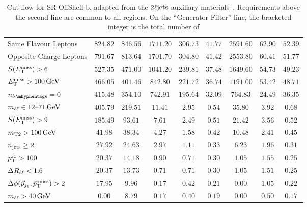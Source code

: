 \begin{sidewaystable}[tp]
{\begin{tabular}{lcccccccc}
Same Flavour Leptons                                       & $824.82$ & $846.56$ & $1711.20$ & $306.73$ & $41.77$ & $2591.60$ & $62.90$ & $52.39$ \\
Opposite Charge Leptons                                   & $791.67$ & $813.64$ & $1701.70$ & $304.80$ & $41.42$ & $2553.80$ & $60.41$ & $51.77$ \\
$\metsig > 6$                                               & $527.35$ & $471.00$ & $1041.20$ & $239.81$ & $37.48$ & $1649.60$ & $54.73$ & $49.23$ \\
$\met > 100\,\eV[G]$                                           & $466.05$ & $401.46$ & $842.80$ & $221.72$ & $36.74$ & $1191.00$ & $53.42$ & $48.71$ \\
\hline
$\nbtag = 0$                                             & $415.48$ & $354.10$ & $742.91$ & $195.64$ & $32.09$ & $764.83$ & $24.49$ & $36.35$ \\
$\mll \in 12\text{--}71\,\eV[G]$                             & $405.79$ & $219.51$ & $11.41$ & $2.95$ & $0.54$ & $35.80$ & $3.92$ & $0.68$ \\
$\metsig > 9$                                             & $185.49$ & $93.61$ & $7.61$ & $2.49$ & $0.51$ & $21.42$ & $3.56$ & $0.52$ \\
$\mttwo > 100\,\eV[G]$                                       & $41.98$ & $38.34$ & $4.27$ & $1.58$ & $0.42$ & $10.48$ & $2.41$ & $0.45$ \\
$\njet \geq 2$                               & $27.92$ & $24.63$ & $2.97$ & $1.11$ & $0.33$ & $6.23$ & $1.96$ & $0.31$ \\
$\pt^{j_1} > 100$                      & $20.37$ & $14.18$ & $0.90$ & $0.71$ & $0.30$ & $1.05$ & $1.55$ & $0.25$ \\
$\rll < 1.6$                                              & $20.37$ & $13.73$ & $0.71$ & $0.71$ & $0.30$ & $1.05$ & $1.51$ & $0.25$ \\
$\dphijmet > 2$               & $17.95$ & $9.96$ & $0.17$ & $0.42$ & $0.21$ & $0.00$ & $1.05$ & $0.22$ \\
$\mll > 40\,\eV[G]$                                          & $0.00$ & $8.79$ & $0.17$ & $0.40$ & $0.19$ & $0.00$ & $0.50$ & $0.17$ \\
\end{tabular}
}
\caption[
Cut-flow for SR-OffShell-b
]{%
Cut-flow for SR-OffShell-b,
adapted from the $\twoljets$ auxiliary materials~\cite{hepdata.116034}.
Requirements above the second line are common to all regions.
On the ``Generator Filter'' line, the bracketed integer is the total number of
}
\end{sidewaystable}
